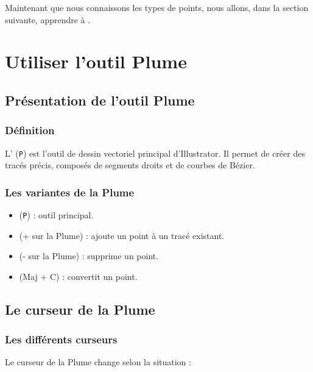 Maintenant que nous connaissons les types de points, nous allons, dans la section suivante, apprendre à .

\section{Utiliser l'outil Plume}

\subsection{Présentation de l'outil Plume}

\subsubsection{Définition}

L' (\texttt{P}) est l'outil de dessin vectoriel principal d'Illustrator. Il permet de créer des tracés précis, composés de segments droits et de courbes de Bézier.

\subsubsection{Les variantes de la Plume}

\begin{itemize}
    \item {} (\texttt{P}) : outil principal.
    \item {} (+ sur la Plume) : ajoute un point à un tracé existant.
    \item {} (- sur la Plume) : supprime un point.
    \item {} (Maj + C) : convertit un point.
\end{itemize}

\subsection{Le curseur de la Plume}

\subsubsection{Les différents curseurs}

Le curseur de la Plume change selon la situation :

